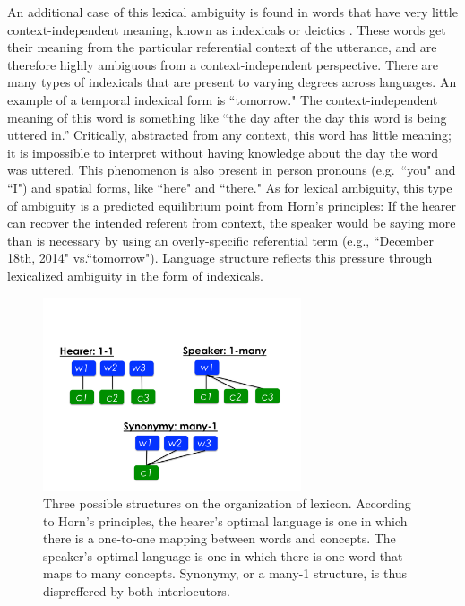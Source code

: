 \documentclass[man, noapacite, 12pt]{apa2}
\begin{document}
An additional case of this lexical ambiguity is found in words that have very little context-independent meaning, known as indexicals or deictics \cite{frawley2003international}. These words get their meaning from the particular referential context of the utterance, and are therefore highly ambiguous from a context-independent perspective. There are many types of indexicals that are present to varying degrees across languages. An example of a temporal indexical form is ``tomorrow." The context-independent meaning of this word is something like ``the day after the day this word is being uttered in.'' Critically, abstracted from any context, this word has little meaning; it is impossible to interpret without having knowledge about the day the word was uttered. This phenomenon is also present in person pronouns (e.g.\ ``you" and ``I") and spatial forms, like ``here" and ``there."  As for lexical ambiguity, this type of ambiguity is a predicted equilibrium point from Horn's principles: If the hearer can recover the intended referent from context, the speaker would be saying more than is necessary by using an overly-specific referential term (e.g., ``December 18th, 2014" vs.``tomorrow"). Language structure reflects this pressure through lexicalized ambiguity in the form of indexicals.

\begin{figure}
\begin{center} 
\includegraphics[width=3in]{figs/onetoone.pdf}
\caption{\label{fig:frank2012} Three possible structures on the organization of lexicon. According to Horn's principles, the hearer's optimal language is one in which there is a one-to-one mapping between words and concepts. The speaker's optimal language is one in which there is one word that maps to many concepts. Synonymy, or a many-1 structure, is thus dispreffered by both interlocutors.}
\end{center} 
\end{figure}
\end{document}

